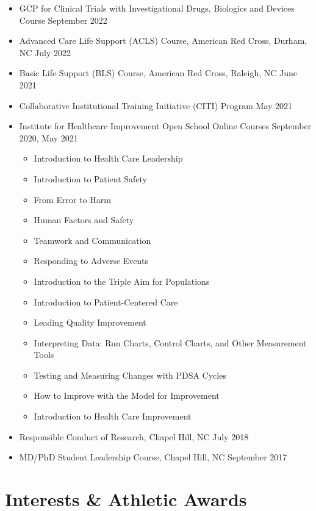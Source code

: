 \documentclass[11pt,letterpaper]{article}
\begin{document}
\begin{itemize}[leftmargin=*, itemsep=2pt, parsep=0pt]
\item GCP for Clinical Trials with Investigational Drugs, Biologics and Devices Course \hfill September 2022
\item Advanced Care Life Support (ACLS) Course, American Red Cross, Durham, NC \hfill July 2022
\item Basic Life Support (BLS) Course, American Red Cross, Raleigh, NC \hfill June 2021
\item Collaborative Institutional Training Initiative (CITI) Program \hfill May 2021
\item Institute for Healthcare Improvement Open School Online Courses \hfill September 2020, May 2021
\begin{itemize}[leftmargin=2em, itemsep=0pt, parsep=0pt]
\item Introduction to Health Care Leadership
\item Introduction to Patient Safety
\item From Error to Harm
\item Human Factors and Safety
\item Teamwork and Communication
\item Responding to Adverse Events
\item Introduction to the Triple Aim for Populations
\item Introduction to Patient-Centered Care
\item Leading Quality Improvement
\item Interpreting Data: Run Charts, Control Charts, and Other Measurement Tools
\item Testing and Measuring Changes with PDSA Cycles
\item How to Improve with the Model for Improvement
\item Introduction to Health Care Improvement
\end{itemize}
\item Responsible Conduct of Research, Chapel Hill, NC \hfill July 2018
\item MD/PhD Student Leadership Course, Chapel Hill, NC \hfill September 2017
\end{itemize}

\vspace{18pt}

\section{Interests \& Athletic Awards}
\end{document}
